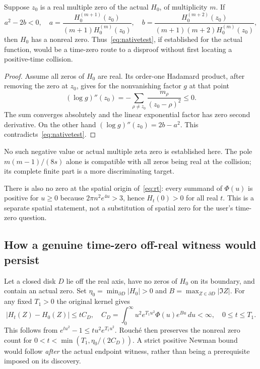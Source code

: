 \documentclass[11pt,a4paper]{article}
\theoremstyle{definition}\newtheorem{definition}[theorem]{Definition}\newtheorem{remark}[theorem]{Remark}
\begin{document}
\begin{corollary}
Suppose $z_0$ is a real multiple zero of the actual $H_0$, of multiplicity $m$. If
\begin{equation}
 a^2-2b<0,\quad
 a=\frac{H_0^{(m+1)}(z_0)}{(m+1)H_0^{(m)}(z_0)},\quad
 b=\frac{H_0^{(m+2)}(z_0)}{(m+1)(m+2)H_0^{(m)}(z_0)},    \label{eq:nativetest}
\end{equation}
then $H_0$ has a nonreal zero. Thus~\eqref{eq:nativetest}, if established for the actual function, would be a time-zero route to a disproof without first locating a positive-time collision.
\end{corollary}
\begin{proof}
Assume all zeros of $H_0$ are real. Its order-one Hadamard product, after removing the zero at $z_0$, gives for the nonvanishing factor $g$ at that point
\[
 (\log g)''(z_0)=-\sum_{\rho\ne z_0}\frac{m_\rho}{(z_0-\rho)^2}\le0.
\]
The sum converges absolutely and the linear exponential factor has zero second derivative. On the other hand $(\log g)''(z_0)=2b-a^2$. This contradicts~\eqref{eq:nativetest}.
\end{proof}
No such negative value or actual multiple zeta zero is established here. The pole $m(m-1)/(8s)$ alone is compatible with all zeros being real at the collision; its complete finite part is a more discriminating target.

There is also no zero at the spatial origin of~\eqref{eq:rt}: every summand of $\Phi(u)$ is positive for $u\ge0$ because $2\pi n^2e^{4u}>3$, hence $H_t(0)>0$ for all real $t$. This is a separate spatial statement, not a substitution of spatial zero for the user's time-zero question.

\subsection{How a genuine time-zero off-real witness would persist}
Let a closed disk $D$ lie off the real axis, have no zeros of $H_0$ on its boundary, and contain an actual zero. Set $\eta_0=\min_{\partial D}|H_0|>0$ and $B=\max_{Z\in\partial D}|\Im Z|$. For any fixed $T_1>0$ the original kernel gives
\[
 |H_t(Z)-H_0(Z)|\le t C_D,\quad
 C_D=\int_0^\infty u^2e^{T_1u^2}\Phi(u)e^{Bu}\,du<\infty,
 \quad 0\le t\le T_1.
\]
This follows from $e^{tu^2}-1\le tu^2e^{T_1u^2}$. Rouch\'e then preserves the nonreal zero count for $0<t<\min(T_1,\eta_0/(2C_D))$. A strict positive Newman bound would follow \emph{after} the actual endpoint witness, rather than being a prerequisite imposed on its discovery.
\end{document}
